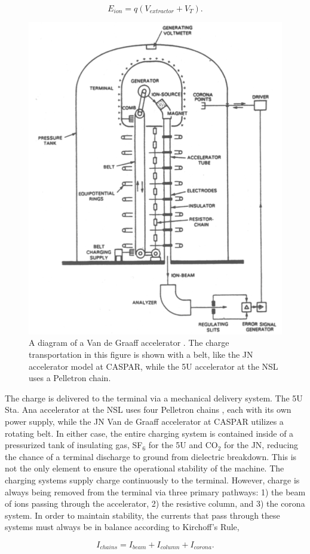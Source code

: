 \begin{equation}
E_{ion} = q(V_{extractor} + V_{T}).
\label{eqn: beam energy}
\end{equation}

\begin{figure}
\centering
\includegraphics[width=0.5\linewidth]{figures/vdgDiagram.png}
\caption{A diagram of a Van de Graaff accelerator \cite{RolfsBook}. The charge transportation in this figure is shown with a belt, like the JN accelerator model at CASPAR, while the 5U accelerator at the NSL uses a Pelletron chain. }
\label{fig: vdg principles}
\end{figure}

The charge is delivered to the terminal via a mechanical delivery system. The 5U Sta. Ana accelerator at the NSL uses four Pelletron chains \cite{Herb1974}, each with its own power supply, while the JN Van de Graaff accelerator at CASPAR utilizes a rotating belt. In either case, the entire charging system is contained inside of a pressurized tank of insulating gas, SF$_{6}$ for the 5U and CO$_2$ for the JN, reducing the chance of a terminal discharge to ground from dielectric breakdown. This is not the only element to ensure the operational stability of the machine. The charging systems supply charge continuously to the terminal. However, charge is always being removed from the terminal via three primary pathways: 1) the beam of ions passing through the accelerator, 2) the resistive column, and 3) the corona system. In order to maintain stability, the currents that pass through these systems must always be in balance according to Kirchoff's Rule,

\begin{equation}
I_{chains} = I_{beam} + I_{column} + I_{corona}.
\end{equation}

